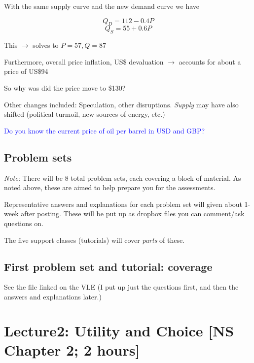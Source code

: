 \documentclass[]{article}
\begin{document}
With the same supply curve and the new demand curve we have

\[Q_D = 112 - 0.4P\] \[Q_S = 55 + 0.6P\]

This \(\rightarrow\) solves to \(P=57, Q=87\)

Furthermore, overall price inflation, US\$ devaluation \(\rightarrow\)
accounts for about a price of US\$94

\bigskip

So why was did the price move to \$130?

Other changes included: Speculation, other disruptions. \emph{Supply}
may have also shifted (political turmoil, new sources of energy, etc.)

\bigskip

\textcolor{blue}{Do you know the current price of oil per barrel in USD and GBP?}

\hypertarget{problem-sets}{%
\subsection{Problem sets}\label{problem-sets}}

\emph{Note:} There will be 8 total problem sets, each covering a block
of material. As noted above, these are aimed to help prepare you for the
assessments.

Representative answers and explanations for each problem set will given
about 1-week after posting. These will be put up as dropbox files you
can comment/ask questions on.

The five support classes (tutorials) will cover \emph{parts} of these.

\hypertarget{first-problem-set-and-tutorial-coverage}{%
\subsection{First problem set and tutorial:
coverage}\label{first-problem-set-and-tutorial-coverage}}

See the file linked on the VLE (I put up just the questions first, and
then the answers and explanations later.)

\hypertarget{lecture2-utility-and-choice-ns-chapter-2-2-hours}{%
\section{Lecture2: Utility and Choice {[}NS Chapter 2; 2
hours{]}}\label{lecture2-utility-and-choice-ns-chapter-2-2-hours}}
\end{document}
